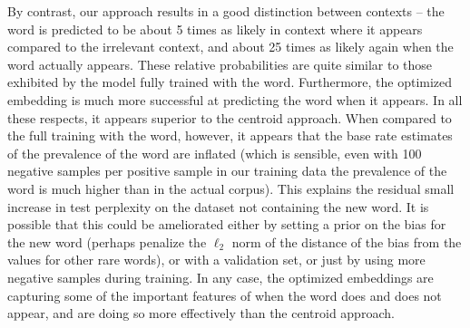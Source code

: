 \documentclass{article}
\begin{document}
By contrast, our approach results in a good distinction between contexts -- the word is predicted to be about 5 times as likely in context where it appears compared to the irrelevant context, and about 25 times as likely again when the word actually appears. These relative probabilities are quite similar to those exhibited by the model fully trained with the word. Furthermore, the optimized embedding is much more successful at predicting the word when it appears. In all these respects, it appears superior to the centroid approach. When compared to the full training with the word, however, it appears that the base rate estimates of the prevalence of the word are inflated (which is sensible, even with 100 negative samples per positive sample in our training data the prevalence of the word is much higher than in the actual corpus). This explains the residual small increase in test perplexity on the dataset not containing the new word. It is possible that this could be ameliorated either by setting a prior on the bias for the new word (perhaps penalize the \(\ell_2\) norm of the distance of the bias from the values for other rare words), or with a validation set, or just by using more negative samples during training. In any case, the optimized embeddings are capturing some of the important features of when the word does and does not appear, and are doing so more effectively than the centroid approach.
\end{document}
